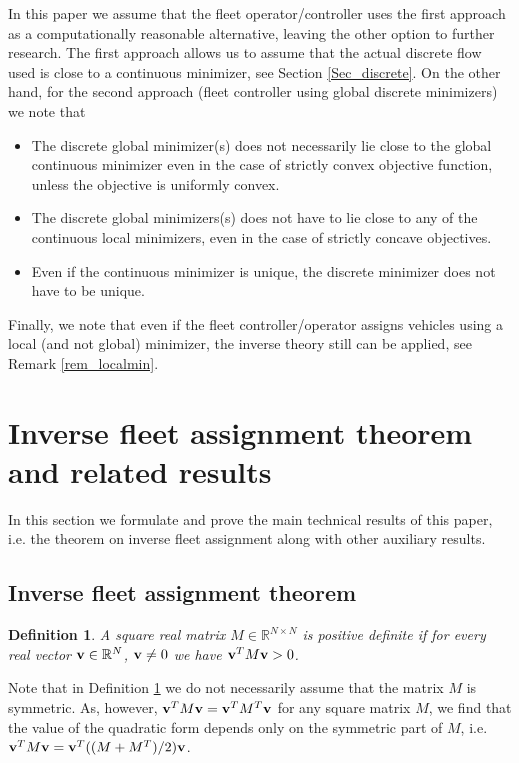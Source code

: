 \documentclass[a4paper,11pt]{article}
\newtheorem{definition}[theorem]{Definition}
\begin{document}
In this paper we assume that the fleet operator/controller uses the first approach as a computationally reasonable alternative, leaving the other option to further research.  The first approach allows us to assume that the actual discrete flow used is close to a continuous minimizer, see Section \ref{Sec_discrete}.  On the other hand, for the second approach (fleet controller using global discrete minimizers) we note that 
\begin{itemize}
\item The discrete global minimizer(s) does not necessarily lie close to the global continuous minimizer even in the case of strictly convex objective function, unless the objective is uniformly convex. 
\item The discrete global minimizers(s) does not have to lie close to any of the continuous local minimizers, even in the case of strictly concave objectives.
\item Even if the continuous minimizer is unique, the discrete minimizer does not have to be unique. 
\end{itemize}

Finally, we note that even if the fleet controller/operator assigns vehicles using a local (and not global) minimizer, the inverse theory still can be applied, see Remark \ref{rem_localmin}. 

\section{Inverse fleet assignment theorem and related results}
\label{Sec_Inverse2}
In this section we formulate and prove the main technical results of this paper, i.e. the theorem on inverse fleet assignment along with other auxiliary results.
\subsection{Inverse fleet assignment theorem}
\begin{definition}
\label{def_posdef}
A square real matrix $M \in \mathbb{R}^{N \times N}$ is \emph{positive definite} if for every real vector $\bold{v} \in \mathbb{R}^N$, $\bold{v} \neq 0$ we have $\bold{v}^T M \bold{v} >0$. 
\end{definition}
Note that in Definition \ref{def_posdef} we do not necessarily assume that the matrix $M$ is symmetric. As, however, $\bold{v}^T M \bold{v} = \bold{v}^T M^T \bold{v}$ for any square matrix $M$, we find that the value of the quadratic form depends only on the symmetric part of $M$, i.e. $\bold{v}^T M \bold{v} = \bold{v}^T ((M + M^T)/2) \bold{v}$. 
\end{document}
